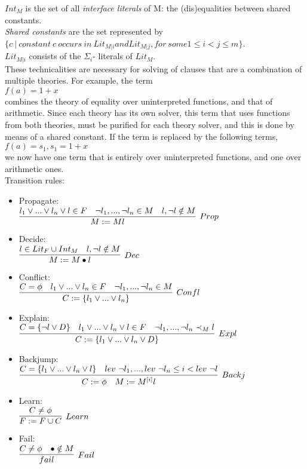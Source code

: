 \documentclass{report}
\begin{document}
$Int_M$ is the set of all \textit{interface literals} of M:
the (dis)equalities between shared constants. \\
\textit{Shared constants} are the set represented by \\
$\{c\ |\ constant\ c\ occurs\ in\ Lit_{M|i} and Lit_{M|j}, 
for\ some 1 \leq i < j \leq m\}$. \\
$Lit_{M|i}$ consists of the $\Sigma_i$- literals of $Lit_M$. \\
These technicalities are necessary for solving of clauses 
that are a combination of multiple theories. 
For example, the term \\
$f(a) = 1 + x$ \\
combines the theory of equality over uninterpreted functions,
and that of arithmetic. Since each theory has its own solver,
this term that uses functions from both theories, must be 
purified for each theory solver, and this is done by means of
a shared constant. If the term is replaced by the following 
terms, \\
$f(a) = s_1, s_1 = 1 + x$ \\
we now have one term that is entirely over uninterpreted 
functions, and one over arithmetic ones. \\
Transition rules:
\begin{itemize}
	\item Propagate:\\ $\infer[Prop]{M := Ml}{l_1 \lor ... \lor l_n \lor l \in F 
		& \neg l_1,...,\neg l_n \in M & l, \neg l \notin M}$ 
	\item Decide:\\ $\infer[Dec]{M := M \bullet l}
	{l \in Lit_F \cup Int_M & l, \neg l \notin M}$ \\
	\item Conflict:\\ $\infer[Confl]{C:=\{l_1 \lor ... \lor l_n\}}
	{C = \phi & l_1 \lor ... \lor l_n \in F & \neg l_1,...,\neg l_n \in M}$ 
	\item Explain:\\ $\infer[Expl]{C := \{l_1 \lor ... \lor l_n \lor D\}}
	{C = \{\neg l \lor D\} & l_1 \lor ... \lor l_n \lor l \in F 
		& \neg l_1,...,\neg l_n \prec_M l}$
	\item Backjump:\\ $\infer[Backj]{C := \phi\ \ \ M := M^{[i]}l}
	{C = \{l_1 \lor ... \lor l_n \lor l\} & 
		lev\ \neg l_1, ... , lev\ \neg l_n \leq i < lev\ \neg l}$
	\item Learn: \\ $\infer[Learn]{F := F \cup C}{C \neq \phi}$
	\item Fail:\\ $\infer[Fail]{fail}{C \neq \phi & \bullet \notin M}$
\end{itemize}
\end{document}
